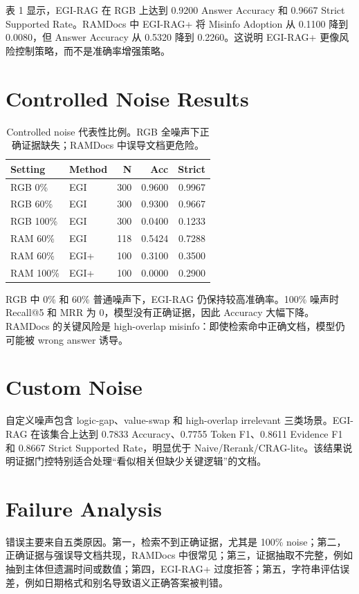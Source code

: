 \documentclass[10pt,twocolumn]{article}
\newcommand{\zh}[1]{{\zhfont #1}}
\begin{document}
\zh{表 1 显示，EGI-RAG 在 RGB 上达到 0.9200 Answer Accuracy 和 0.9667 Strict Supported Rate。RAMDocs 中 EGI-RAG+ 将 Misinfo Adoption 从 0.1100 降到 0.0080，但 Answer Accuracy 从 0.5320 降到 0.2260。这说明 EGI-RAG+ 更像风险控制策略，而不是准确率增强策略。}

\section{Controlled Noise Results}
\begin{table}[t]
\centering
\small
\begin{tabular}{l l r r r}
\hline
Setting & Method & N & Acc & Strict \\
\hline
RGB 0\% & EGI & 300 & 0.9600 & 0.9967 \\
RGB 60\% & EGI & 300 & 0.9300 & 0.9667 \\
RGB 100\% & EGI & 300 & 0.0400 & 0.1233 \\
RAM 60\% & EGI & 118 & 0.5424 & 0.7288 \\
RAM 60\% & EGI+ & 100 & 0.3100 & 0.3500 \\
RAM 100\% & EGI+ & 100 & 0.0000 & 0.2900 \\
\hline
\end{tabular}
\caption{\zh{Controlled noise 代表性比例。RGB 全噪声下正确证据缺失；RAMDocs 中误导文档更危险。}}
\end{table}

\zh{RGB 中 0\% 和 60\% 普通噪声下，EGI-RAG 仍保持较高准确率。100\% 噪声时 Recall@5 和 MRR 为 0，模型没有正确证据，因此 Accuracy 大幅下降。RAMDocs 的关键风险是 high-overlap misinfo：即使检索命中正确文档，模型仍可能被 wrong answer 诱导。}

\section{Custom Noise}
\zh{自定义噪声包含 logic-gap、value-swap 和 high-overlap irrelevant 三类场景。EGI-RAG 在该集合上达到 0.7833 Accuracy、0.7755 Token F1、0.8611 Evidence F1 和 0.8667 Strict Supported Rate，明显优于 Naive/Rerank/CRAG-lite。该结果说明证据门控特别适合处理“看似相关但缺少关键逻辑”的文档。}

\section{Failure Analysis}
\zh{错误主要来自五类原因。第一，检索不到正确证据，尤其是 100\% noise；第二，正确证据与强误导文档共现，RAMDocs 中很常见；第三，证据抽取不完整，例如抽到主体但遗漏时间或数值；第四，EGI-RAG+ 过度拒答；第五，字符串评估误差，例如日期格式和别名导致语义正确答案被判错。}
\end{document}
